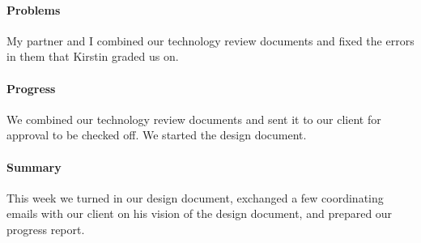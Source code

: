 \documentclass[onecolumn, draftclsnofoot,10pt, compsoc]{IEEEtran}
\begin{document}
\paragraph{Problems}
My partner and I combined our technology review documents and fixed the errors in them that Kirstin graded us on.
\paragraph{Progress}
 We combined our technology review documents and sent it to our client for approval to be checked off. We started the design document.
\paragraph{Summary}
This week we turned in our design document, exchanged a few coordinating emails with our client on his vision of the design document, and prepared our progress report.
\end{document}
